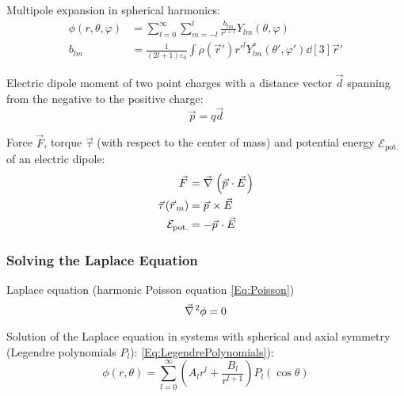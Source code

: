 			\noindent
			Multipole expansion in spherical harmonics:
			\begin{equation}
				\begin{aligned}
					\phi(r,\theta,\varphi) &= \sum_{l=0}^{\infty}\sum_{m=-l}^{l} \frac{b_{lm}}{r^{l+1}}Y_{lm}(\theta,\varphi) \\
					b_{lm} &= \frac{1}{(2l+1)\varepsilon_0}\int\rho(\vec{r}')r'^lY^{*}_{lm}(\theta',\varphi')\dd[3]{\vec{r}'}
				\end{aligned}
			\end{equation}

			\noindent
			Electric dipole moment of two point charges with a distance vector $\vec{d}$ spanning from the negative to the positive charge:
			\begin{equation}
				\vec{p}=q\vec{d}
			\end{equation}

			\noindent
			Force $\vec{F}$, torque $\vec{\tau}$ (with respect to the center of mass) and potential energy $\mathcal{E}_\text{pot.}$ of an electric dipole:
			\begin{equation}
				\begin{aligned}
					\vec{F} &= \Nabla\left(\vec{p}\cdot\vec{E}\right) \\
					\vec{\tau}(\vec{r}_m) &= \vec{p}\times\vec{E} \\
					\mathcal{E}_\text{pot.} &= -\vec{p}\cdot\vec{E} \\
				\end{aligned}
			\end{equation}

		\subsubsection{Solving the Laplace Equation} \label{Sec:SolvingTheLaplaceEquation}
			\noindent
			Laplace equation (harmonic Poisson equation \ref{Eq:Poisson})
			\begin{equation}
				\Nabla^2 \phi = 0
			\end{equation}

			\noindent
			Solution of the Laplace equation in systems with spherical and axial symmetry (Legendre polynomials $P_l$): \ref{Eq:LegendrePolynomials}):
			\begin{equation}
				\phi(r,\theta)=\sum_{l=0}^\infty \left(A_l r^l + \frac{B_l}{r^{l+1}}\right)P_l(\cos\theta)
			\end{equation}

